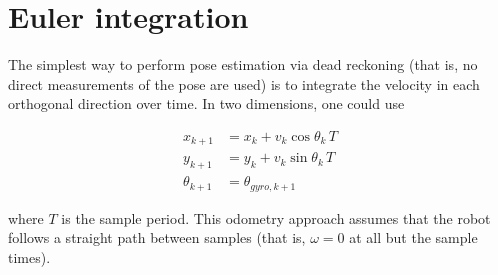 \section{Euler integration}

The simplest way to perform pose estimation via dead reckoning (that is, no
direct measurements of the pose are used) is to integrate the velocity in each
orthogonal direction over time. In two dimensions, one could use

\begin{align*}
  x_{k+1} &= x_k + v_k\cos\theta_k\,T \\
  y_{k+1} &= y_k + v_k\sin\theta_k\,T \\
  \theta_{k+1} &= \theta_{gyro,k+1}
\end{align*}

where $T$ is the sample period. This odometry approach assumes that the robot
follows a straight path between samples (that is, $\omega = 0$ at all but the
sample times).
